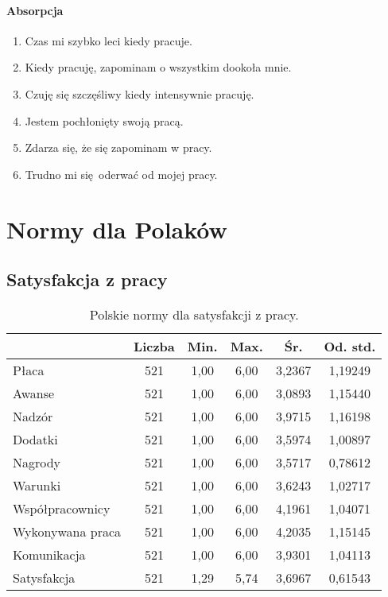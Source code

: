 \paragraph{Absorpcja}
\begin{enumerate}
  \item Czas mi szybko leci kiedy pracuje.
  \item Kiedy pracuję, zapominam o wszystkim dookoła mnie.
  \item Czuję się szczęśliwy kiedy intensywnie pracuję.
  \item Jestem pochłonięty swoją pracą.
  \item Zdarza się, że się zapominam w pracy.
  \item Trudno mi się oderwać od mojej pracy.
\end{enumerate}
\cleardoublepage
\section{Normy dla Polaków}
\subsection{Satysfakcja z pracy}
\label{sec:app-jss-norms}

\begin{table}[h!]
\begin{center}
\begin{tabular}{l | c c c c c}
  & Liczba & Min. & Max. & Śr. & Od. std. \\ \hline
Płaca & 521 & 1,00 & 6,00 & 3,2367 & 1,19249 \\
Awanse & 521 & 1,00 & 6,00 & 3,0893 & 1,15440 \\ 
Nadzór &  521 & 1,00 & 6,00 & 3,9715 & 1,16198 \\
Dodatki &  521 & 1,00 & 6,00 & 3,5974 & 1,00897 \\
Nagrody &  521 & 1,00 & 6,00 & 3,5717 & 0,78612 \\
Warunki &  521 & 1,00 & 6,00 & 3,6243 & 1,02717 \\
Współpracownicy &  521 & 1,00 & 6,00 & 4,1961 & 1,04071 \\
Wykonywana praca &  521 & 1,00 & 6,00 & 4,2035 & 1,15145 \\
Komunikacja & 521 & 1,00 & 6,00 & 3,9301 & 1,04113 \\ \hline
Satysfakcja & 521 & 1,29 & 5,74 & 3,6967 & 0,61543 \\
\end{tabular}
\end{center}
\caption{Polskie normy dla satysfakcji z pracy.}
\label{tab:jss-pl-norms}
\end{table}

